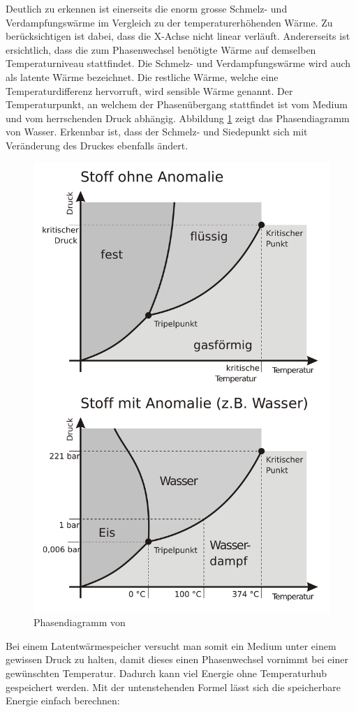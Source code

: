 \documentclass[11pt,a4paper]{scrartcl}
\begin{document}
Deutlich zu erkennen ist einerseits die enorm grosse Schmelz- und
Verdampfungswärme im Vergleich zu der temperaturerhöhenden Wärme. Zu
berücksichtigen ist dabei, dass die X-Achse nicht linear verläuft. Andererseits
ist ersichtlich, dass die zum Phasenwechsel benötigte Wärme auf demselben
Temperaturniveau stattfindet. Die Schmelz- und Verdampfungswärme wird auch als
latente Wärme bezeichnet. Die restliche Wärme, welche eine Temperaturdifferenz
hervorruft, wird sensible Wärme genannt.
Der Temperaturpunkt, an welchem der Phasenübergang stattfindet ist vom Medium
und vom herrschenden Druck abhängig. Abbildung \ref{fig:H2O2} zeigt das
Phasendiagramm von Wasser. Erkennbar ist, dass der Schmelz- und Siedepunkt sich
mit Veränderung des Druckes ebenfalls ändert.
\begin{figure}[h]
\begin{center}
\includegraphics[scale=0.6]{images/Phasendiagramm2d.pdf}
\caption{Phasendiagramm von  \cite{Phasendiagramm}}
\label{fig:H2O2}
\end{center}
\end{figure}
Bei einem Latentwärmespeicher versucht man somit ein Medium unter einem gewissen
Druck zu halten, damit dieses einen Phasenwechsel vornimmt bei einer gewünschten
Temperatur. Dadurch kann viel Energie ohne Temperaturhub gespeichert
werden. Mit der untenstehenden Formel lässt sich die speicherbare Energie
einfach berechnen:
\end{document}

